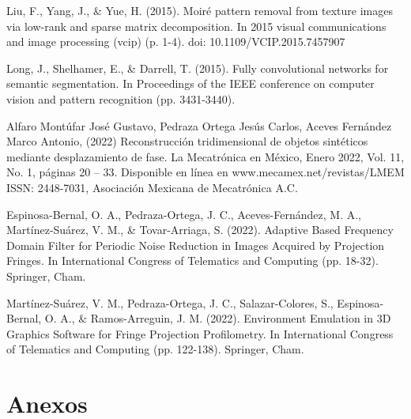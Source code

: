 \documentclass[10pt,letterpaper]{article}
\begin{document}
\begin{thebibliography}{0}
Liu, F., Yang, J., \& Yue, H. (2015). Moiré pattern removal from texture images via low-rank and sparse matrix decomposition. In 2015 visual communications and image processing (vcip)
(p. 1-4). doi: 10.1109/VCIP.2015.7457907

Long, J., Shelhamer, E., \& Darrell, T. (2015). Fully convolutional networks for semantic segmentation. In Proceedings of the IEEE conference on computer vision and pattern recognition (pp. 3431-3440).

Alfaro Montúfar José Gustavo, Pedraza Ortega Jesús Carlos, Aceves Fernández
Marco Antonio, (2022) Reconstrucción tridimensional de objetos sintéticos mediante desplazamiento de fase. La Mecatrónica en México, Enero 2022, Vol. 11, No. 1, páginas 20 – 33. Disponible en línea en www.mecamex.net/revistas/LMEM
ISSN: 2448-7031, Asociación Mexicana de Mecatrónica A.C.

Espinosa-Bernal, O. A., Pedraza-Ortega, J. C., Aceves-Fernández, M. A., Martínez-Suárez, V. M., \& Tovar-Arriaga, S. (2022). Adaptive Based Frequency Domain Filter for Periodic Noise Reduction in Images Acquired by Projection Fringes. In International Congress of Telematics and Computing (pp. 18-32). Springer, Cham.

Martínez-Suárez, V. M., Pedraza-Ortega, J. C., Salazar-Colores, S., Espinosa-Bernal, O. A., \& Ramos-Arreguin, J. M. (2022). Environment Emulation in 3D Graphics Software for Fringe Projection Profilometry. In International Congress of Telematics and Computing (pp. 122-138). Springer, Cham.

\end{thebibliography}

\section{Anexos}


%
\end{document}
